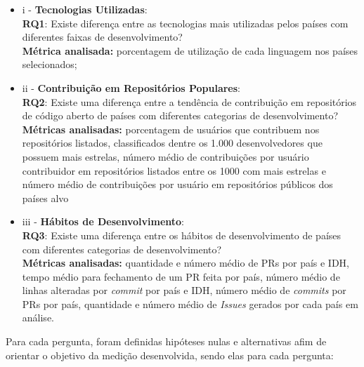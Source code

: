 \documentclass[12pt]{article}
\begin{document}
\begin{itemize}
    \item i - \textbf{Tecnologias Utilizadas}: \\
    \textbf{RQ1}: Existe diferença entre as tecnologias mais utilizadas pelos países com diferentes faixas de desenvolvimento? \\
    \textbf{Métrica analisada:} porcentagem de utilização de cada linguagem nos países selecionados;
    \item ii - \textbf{Contribuição em Repositórios Populares}: \\
    \textbf{RQ2}: Existe uma diferença entre a tendência de contribuição em repositórios de código aberto de países com diferentes categorias de desenvolvimento? \\
    \textbf{Métricas analisadas:} porcentagem de usuários que contribuem nos repositórios listados, classificados dentre os 1.000 desenvolvedores que possuem mais estrelas, número médio de contribuições por usuário contribuidor em repositórios listados entre os 1000 com mais estrelas e número médio de contribuições por usuário em repositórios públicos dos países alvo
    \item iii - \textbf{Hábitos de Desenvolvimento}: \\
    \textbf{RQ3}: Existe uma diferença entre os hábitos de desenvolvimento de países com diferentes categorias de desenvolvimento? \\
    \textbf{Métricas analisadas:} quantidade e número médio de PRs por país e IDH, tempo médio para fechamento de um PR feita por país, número médio de linhas alteradas por \textit{commit} por país e IDH, número médio de \textit{commits} por PRs por país, quantidade e número médio de \textit{Issues} gerados por cada país em análise. 
\end{itemize}

Para cada pergunta, foram definidas hipóteses nulas e alternativas afim de orientar o objetivo da medição desenvolvida, sendo elas para cada pergunta: 
\end{document}

